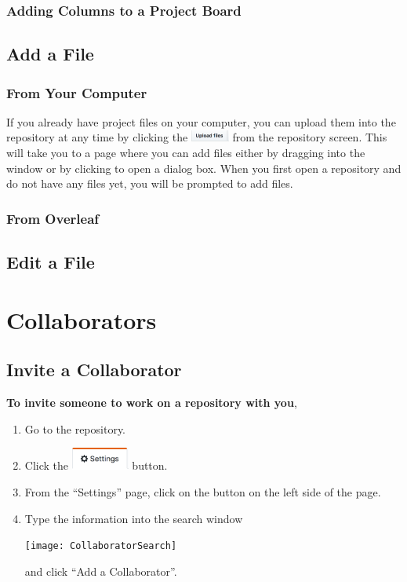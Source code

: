 \documentclass[11pt]{article}
\begin{document}
\subsubsection{Adding Columns to a Project Board}



\subsection{Add a File}

\subsubsection{From Your Computer} 

If you already have project files on your computer, you can upload them into the repository at any time by clicking the \includegraphics[width=0.5in]{UploadFilesbutton} from the repository screen. This will take you to a page where you can add files either by dragging into the window or by clicking to open a dialog box. When you first open a repository and do not have any files yet, you will be prompted to add files. 

\subsubsection{From Overleaf}

\subsection{Edit a File}

\section{Collaborators}

\subsection{Invite a Collaborator} 

\textbf{To invite someone to work on a repository with you},

\begin{enumerate}
\item Go to the repository.
\item Click the \includegraphics[width=0.75in]{SettingsButton} button.  
\item From the ``Settings'' page, click on the  button on the left side of the page.
\item Type the information into the search window \begin{center} 
\texttt{[image: CollaboratorSearch]}
\end{center}
and click ``Add a Collaborator''. 
\end{enumerate}
\end{document}
